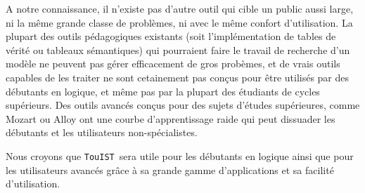 \documentclass{iaf}
\newcommand{\nameTool}{{\sc \texttt {TouIST}}}
\begin{document}
A notre connaissance, il n'existe pas d'autre outil qui cible un public aussi large, ni la m\^eme grande classe de probl\`emes, ni avec le m\^eme confort d'utilisation. La plupart des outils p\'edagogiques existants (soit l'impl\'ementation de tables de v\'erit\'e ou tableaux s\'emantiques) qui pourraient faire le travail de recherche d'un mod\`ele ne peuvent pas g\'erer efficacement de gros prob\`emes, et de vrais outils capables de les traiter ne sont cetainement pas con\c cus pour \^etre utilis\'es par des d\'ebutants en logique, et m\^eme pas par la plupart des \'etudiants de cycles sup\'erieurs.
Des outils avanc\'es con\c cus pour des sujets d'\'etudes sup\'erieures, comme Mozart \cite{DBLP:conf/moz/2004} ou Alloy  \cite{Jackson:2006:SAL:1146359} ont une courbe d'apprentissage raide qui peut dissuader les d\'ebutants et les utilisateurs non-sp\'ecialistes.

Nous croyons que \nameTool\ sera utile pour les d\'ebutants en logique ainsi que pour les utilisateurs avanc\'es gr\^{a}ce \`a sa grande gamme d'applications et sa facilit\'e d'utilisation.





\end{document}
